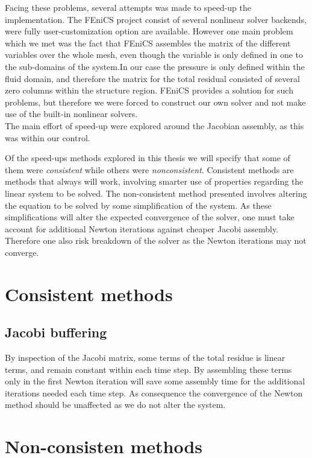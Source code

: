 Facing these problems, several attempts was made to speed-up the implementation. The FEniCS project consist of several nonlinear solver backends, were fully user-customization option are available. However one main problem which we met was the fact that FEniCS assembles the matrix of the different variables over the whole mesh, even though the variable is only defined in one to the sub-domains of the system.In our case the pressure is only defined within the fluid domain, and therefore the matrix for the total residual consisted of several zero columns within the structure region. FEniCS provides a solution for such problems, but therefore we were forced to construct our own solver and not make use of the built-in nonlinear solvers. \\

The main effort of speed-up were explored around the Jacobian assembly, as this was within our control.  

Of the speed-ups methods explored in this thesis we will specify that some of them were \textit{consistent} while others were \textit{nonconsistent}. Consistent methods are methods that always will work, involving smarter use of properties regarding the linear system to be solved. The non-consistent method presented involves altering the equation to be solved by some simplification of the system. As these simplifications will alter the expected convergence of the solver, one must take account for additional Newton iterations against cheaper Jacobi assembly. Therefore one also risk breakdown of the solver as the Newton iterations may not converge.   


\section{Consistent methods}
\subsection{Jacobi buffering}
By inspection of the Jacobi matrix, some terms of the total residue is linear terms, and remain constant within each time step. By assembling these terms only in the first Newton iteration will save some assembly time for the additional iterations needed each time step. As consequence the convergence of the Newton method should be unaffected as we do not alter the system.  

\section{Non-consisten methods}    
